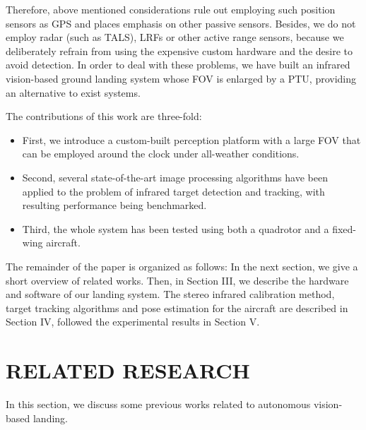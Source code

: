 \documentclass[letterpaper, 10 pt, conference]{ieeeconf}  %
\begin{document}
Therefore, above mentioned considerations rule out employing such position sensors as GPS and places emphasis on other passive sensors. Besides, we do not employ radar (such as TALS), LRFs or other active range sensors, because we deliberately refrain from using the expensive custom hardware and the desire to avoid detection. In order to deal with these problems, we have built an infrared vision-based ground landing system whose FOV is enlarged by a PTU, providing an alternative to exist systems.

The contributions of this work are three-fold: 
\begin{itemize}
\item First, we introduce a custom-built perception platform with a large FOV that can be employed around the clock under all-weather conditions.
\item Second, several state-of-the-art image processing algorithms have been applied to the problem of infrared target detection and tracking, with resulting performance being benchmarked.
\item Third, the whole system has been tested using both  a quadrotor and a fixed-wing aircraft.
\end{itemize}

The remainder of the paper is organized as follows: In the next section, we give a short overview of related works. Then, in Section III, we describe the hardware and software of our landing system. The stereo infrared calibration method, target tracking algorithms and pose estimation for the aircraft are described in Section IV, followed the experimental results in Section V.


\section{RELATED RESEARCH}

In this section, we discuss some previous works related to autonomous vision-based landing.
\end{document}
